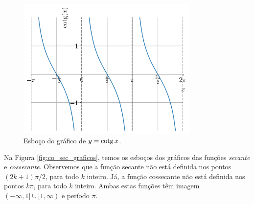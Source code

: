 \begin{figure}[H]
  \centering
  \includegraphics[width=0.8\textwidth]{./cap_funcao/dados/fig_co_tg_graficos/fig_cotg_grafico}
  \caption{Esboço do gráfico de $y=\operatorname{cotg} x$.}
  \label{fig:cotg_grafico}
\end{figure}

Na Figura \ref{fig:co_sec_graficos}, temos os esboços dos gráficos das funções \emph{secante} e \emph{cossecante}. Observemos que a função secante não está definida nos pontos $(2k+1)\pi/2$, para todo $k$ inteiro. Já, a função cossecante não está definida nos pontos $k\pi$, para todo $k$ inteiro. Ambas estas funções têm imagem $(-\infty, 1]\cup [1, \infty)$ e período $\pi$.


